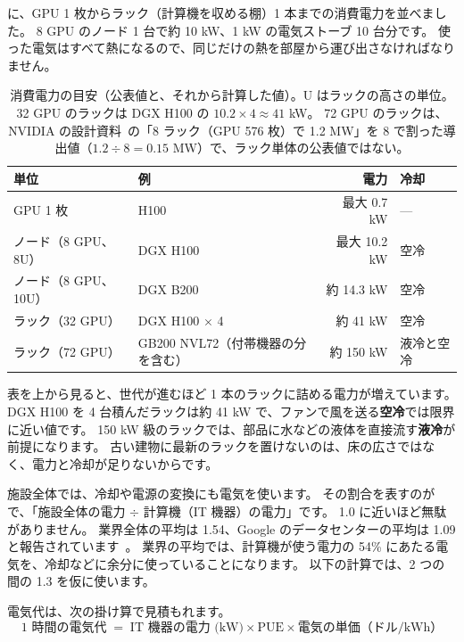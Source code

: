 に、GPU 1 枚からラック（計算機を収める棚）1 本までの消費電力を並べました。
8 GPU のノード 1 台で約 10 kW、1 kW の電気ストーブ 10 台分です。
使った電気はすべて熱になるので、同じだけの熱を部屋から運び出さなければなりません。

\begin{table}[htbp]
\centering
\caption{消費電力の目安（公表値と、それから計算した値）。U はラックの高さの単位。
32 GPU のラックは DGX H100 の $10.2\times4\approx41$ kW。
72 GPU のラックは、NVIDIA の設計資料~\cite{nvidia2025superpod}の「8 ラック（GPU 576 枚）で 1.2 MW」を 8 で割った導出値（$1.2\div8=0.15$ MW）で、ラック単体の公表値ではない。}
\label{tab:infra-power}
\footnotesize
\begin{tabular}{llrl}
\toprule
単位 & 例 & 電力 & 冷却 \\
\midrule
GPU 1 枚 & H100 & 最大 0.7 kW & --- \\
ノード（8 GPU、8U） & DGX H100 & 最大 10.2 kW & 空冷 \\
ノード（8 GPU、10U） & DGX B200 & 約 14.3 kW & 空冷 \\
ラック（32 GPU） & DGX H100 $\times$ 4 & 約 41 kW & 空冷 \\
ラック（72 GPU） & GB200 NVL72（付帯機器の分を含む） & 約 150 kW & 液冷と空冷 \\
\bottomrule
\end{tabular}
\end{table}

表を上から見ると、世代が進むほど 1 本のラックに詰める電力が増えています。
DGX H100 を 4 台積んだラックは約 41 kW で、ファンで風を送る\textbf{空冷}では限界に近い値です。
150 kW 級のラックでは、部品に水などの液体を直接流す\textbf{液冷}が前提になります。
古い建物に最新のラックを置けないのは、床の広さではなく、電力と冷却が足りないからです。

施設全体では、冷却や電源の変換にも電気を使います。
その割合を表すのが で、「施設全体の電力 $\div$ 計算機（IT 機器）の電力」です。
1.0 に近いほど無駄がありません。
業界全体の平均は 1.54、Google のデータセンターの平均は 1.09 と報告されています~\cite{google2026power}。
業界の平均では、計算機が使う電力の 54\% にあたる電気を、冷却などに余分に使っていることになります。
以下の計算では、2 つの間の 1.3 を仮に使います。

電気代は、次の掛け算で見積もれます。
\begin{equation}
\text{1 時間の電気代} \;=\; \text{IT 機器の電力 (kW)} \times \mathrm{PUE} \times \text{電気の単価（ドル/kWh）}
\label{eq:infra-power}
\end{equation}

